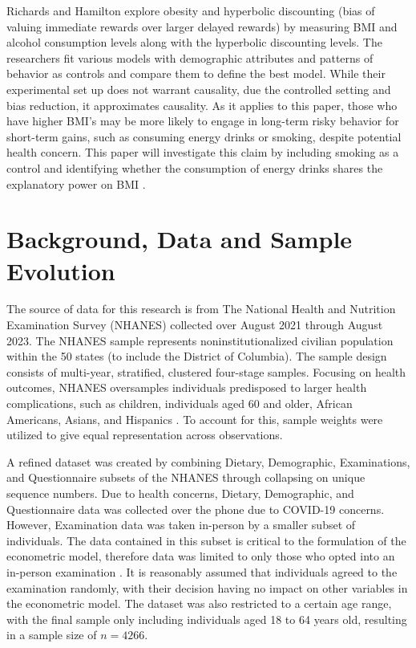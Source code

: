 \documentclass[12pt]{article}
\begin{document}
Richards and Hamilton explore obesity and hyperbolic discounting (bias of valuing immediate rewards over larger delayed rewards) by measuring BMI and alcohol consumption levels along with the hyperbolic discounting levels. The researchers fit various models with demographic attributes and patterns of behavior as controls and compare them to define the best model. While their experimental set up does not warrant causality, due the controlled setting and bias reduction, it approximates causality. As it applies to this paper, those who have higher BMI's may be more likely to engage in long-term risky behavior for short-term gains, such as consuming energy drinks or smoking, despite potential health concern. This paper will investigate this claim by including smoking as a control and identifying whether the consumption of energy drinks shares the explanatory power on BMI \citep{richards2012}.

\section{Background, Data and Sample Evolution}

The source of data for this research is from The National Health and Nutrition Examination Survey (NHANES) collected over August 2021 through August 2023. The NHANES sample represents noninstitutionalized civilian population within the 50 states (to include the District of Columbia). The sample design consists of multi-year, stratified, clustered four-stage samples. Focusing on health outcomes, NHANES oversamples individuals predisposed to larger health complications, such as children, individuals aged 60 and older, African Americans, Asians, and Hispanics \citep{cdc2023}. To account for this, sample weights were utilized to give equal representation across observations.

A refined dataset was created by combining Dietary, Demographic, Examinations, and Questionnaire subsets of the NHANES through collapsing on unique sequence numbers. Due to health concerns, Dietary, Demographic, and Questionnaire data was collected over the phone due to COVID-19 concerns. However, Examination data was taken in-person by a smaller subset of individuals. The data contained in this subset is critical to the formulation of the econometric model, therefore data was limited to only those who opted into an in-person examination \citep{cdc2023}. It is reasonably assumed that individuals agreed to the examination randomly, with their decision having no impact on other variables in the econometric model. The dataset was also restricted to a certain age range, with the final sample only including individuals aged 18 to 64 years old, resulting in a sample size of $n=4266$.
\end{document}
